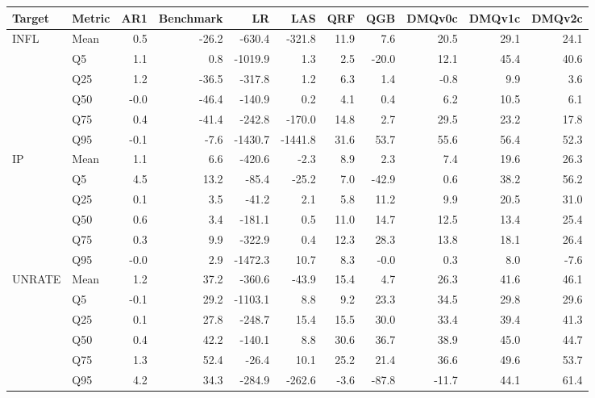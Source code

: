 \begin{tabular}{llrrrrrrrrr}
\toprule
Target & Metric & AR1 & Benchmark & LR & LAS & QRF & QGB & DMQv0c & DMQv1c & DMQv2c \\
\midrule
\multirow{6}{*}{INFL} & Mean & 0.5 & -26.2 & -630.4 & -321.8 & 11.9 & 7.6 & 20.5 & 29.1 & 24.1 \\
 & Q5 & 1.1 & 0.8 & -1019.9 & 1.3 & 2.5 & -20.0 & 12.1 & 45.4 & 40.6 \\
 & Q25 & 1.2 & -36.5 & -317.8 & 1.2 & 6.3 & 1.4 & -0.8 & 9.9 & 3.6 \\
 & Q50 & -0.0 & -46.4 & -140.9 & 0.2 & 4.1 & 0.4 & 6.2 & 10.5 & 6.1 \\
 & Q75 & 0.4 & -41.4 & -242.8 & -170.0 & 14.8 & 2.7 & 29.5 & 23.2 & 17.8 \\
 & Q95 & -0.1 & -7.6 & -1430.7 & -1441.8 & 31.6 & 53.7 & 55.6 & 56.4 & 52.3 \\
\midrule
\multirow{6}{*}{IP} & Mean & 1.1 & 6.6 & -420.6 & -2.3 & 8.9 & 2.3 & 7.4 & 19.6 & 26.3 \\
 & Q5 & 4.5 & 13.2 & -85.4 & -25.2 & 7.0 & -42.9 & 0.6 & 38.2 & 56.2 \\
 & Q25 & 0.1 & 3.5 & -41.2 & 2.1 & 5.8 & 11.2 & 9.9 & 20.5 & 31.0 \\
 & Q50 & 0.6 & 3.4 & -181.1 & 0.5 & 11.0 & 14.7 & 12.5 & 13.4 & 25.4 \\
 & Q75 & 0.3 & 9.9 & -322.9 & 0.4 & 12.3 & 28.3 & 13.8 & 18.1 & 26.4 \\
 & Q95 & -0.0 & 2.9 & -1472.3 & 10.7 & 8.3 & -0.0 & 0.3 & 8.0 & -7.6 \\
\midrule
\multirow{6}{*}{UNRATE} & Mean & 1.2 & 37.2 & -360.6 & -43.9 & 15.4 & 4.7 & 26.3 & 41.6 & 46.1 \\
 & Q5 & -0.1 & 29.2 & -1103.1 & 8.8 & 9.2 & 23.3 & 34.5 & 29.8 & 29.6 \\
 & Q25 & 0.1 & 27.8 & -248.7 & 15.4 & 15.5 & 30.0 & 33.4 & 39.4 & 41.3 \\
 & Q50 & 0.4 & 42.2 & -140.1 & 8.8 & 30.6 & 36.7 & 38.9 & 45.0 & 44.7 \\
 & Q75 & 1.3 & 52.4 & -26.4 & 10.1 & 25.2 & 21.4 & 36.6 & 49.6 & 53.7 \\
 & Q95 & 4.2 & 34.3 & -284.9 & -262.6 & -3.6 & -87.8 & -11.7 & 44.1 & 61.4 \\
\bottomrule
\end{tabular}
